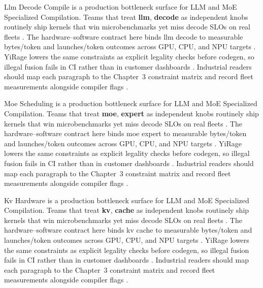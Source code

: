 Llm Decode Compile is a production bottleneck surface for LLM and MoE Specialized Compilation. Teams that treat \textbf{llm}, \textbf{decode} as independent knobs routinely ship kernels that win microbenchmarks yet miss decode SLOs on real fleets \citep{dao2022flashattention,liu2024deepseekv3}. The hardware--software contract here binds llm decode to measurable bytes/token and launches/token outcomes across GPU, CPU, and NPU targets \citep{kwon2023vllm,patel2025llminference}. YiRage lowers the same constraints as explicit legality checks before codegen, so illegal fusion fails in CI rather than in customer dashboards \citep{nvidia2024cudagraphs,taxbreak2026}. Industrial readers should map each paragraph to the Chapter~3 constraint matrix and record fleet measurements alongside compiler flags \citep{liu2024deepseekv3,memoryfloor2026}.

Moe Scheduling is a production bottleneck surface for LLM and MoE Specialized Compilation. Teams that treat \textbf{moe}, \textbf{expert} as independent knobs routinely ship kernels that win microbenchmarks yet miss decode SLOs on real fleets \citep{kwon2023vllm,patel2025llminference}. The hardware--software contract here binds moe expert to measurable bytes/token and launches/token outcomes across GPU, CPU, and NPU targets \citep{nvidia2024cudagraphs,taxbreak2026}. YiRage lowers the same constraints as explicit legality checks before codegen, so illegal fusion fails in CI rather than in customer dashboards \citep{liu2024deepseekv3,memoryfloor2026}. Industrial readers should map each paragraph to the Chapter~3 constraint matrix and record fleet measurements alongside compiler flags \citep{patel2025llminference,nvidia2022hopper}.

Kv Hardware is a production bottleneck surface for LLM and MoE Specialized Compilation. Teams that treat \textbf{kv}, \textbf{cache} as independent knobs routinely ship kernels that win microbenchmarks yet miss decode SLOs on real fleets \citep{nvidia2024cudagraphs,taxbreak2026}. The hardware--software contract here binds kv cache to measurable bytes/token and launches/token outcomes across GPU, CPU, and NPU targets \citep{liu2024deepseekv3,memoryfloor2026}. YiRage lowers the same constraints as explicit legality checks before codegen, so illegal fusion fails in CI rather than in customer dashboards \citep{patel2025llminference,nvidia2022hopper}. Industrial readers should map each paragraph to the Chapter~3 constraint matrix and record fleet measurements alongside compiler flags \citep{taxbreak2026,semianalysis2024tma}.

